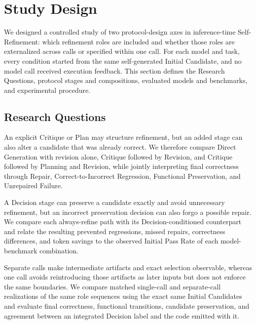\section{Study Design}

We designed a controlled study of two protocol-design axes in inference-time Self-Refinement: which refinement roles are included and whether those roles are externalized across calls or specified within one call.
For each model and task, every condition started from the same self-generated Initial Candidate, and no model call received execution feedback.
This section defines the Research Questions, protocol stages and compositions, evaluated models and benchmarks, and experimental procedure.

\subsection{Research Questions}

An explicit Critique or Plan may structure refinement, but an added stage can also alter a candidate that was already correct.
We therefore compare Direct Generation with revision alone, Critique followed by Revision, and Critique followed by Planning and Revision, while jointly interpreting final correctness through Repair, Correct-to-Incorrect Regression, Functional Preservation, and Unrepaired Failure.

A Decision stage can preserve a candidate exactly and avoid unnecessary refinement, but an incorrect preservation decision can also forgo a possible repair.
We compare each always-refine path with its Decision-conditioned counterpart and relate the resulting prevented regressions, missed repairs, correctness differences, and token savings to the observed Initial Pass Rate of each model-benchmark combination.

Separate calls make intermediate artifacts and exact selection observable, whereas one call avoids reintroducing those artifacts as later inputs but does not enforce the same boundaries.
We compare matched single-call and separate-call realizations of the same role sequences using the exact same Initial Candidates and evaluate final correctness, functional transitions, candidate preservation, and agreement between an integrated Decision label and the code emitted with it.

